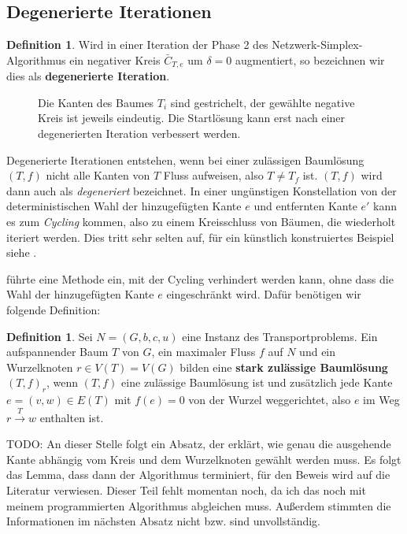 \documentclass[a4paper,twoside,ngerman]{report}
\theoremstyle{plain}
\theoremstyle{definition}
\newtheorem{defn}[thm]{Definition}
\begin{document}
\subsection{Degenerierte Iterationen}\label{ch:deg}

\begin{defn}Wird in einer Iteration der Phase 2 des Netzwerk-Simplex-Algorithmus ein negativer Kreis $\bar{C}_{T,e}$ um $\delta=0$ augmentiert, so bezeichnen wir dies als \textbf{degenerierte Iteration}.
\end{defn}

\begin{figure}[!ht]\centering
	
	\caption{Die Kanten des Baumes $T_i$ sind gestrichelt, der gewählte negative Kreis ist jeweils eindeutig. Die Startlösung kann erst nach einer degenerierten Iteration verbessert werden.}
	\label{fig:deg}
\end{figure}

Degenerierte Iterationen entstehen, wenn bei einer zulässigen Baumlösung $(T,f)$ nicht alle Kanten von $T$ Fluss aufweisen, also $T\neq T_f$ ist. $(T,f)$ wird dann auch als \emph{degeneriert} bezeichnet. In einer ungünstigen Konstellation von der deterministischen Wahl der hinzugefügten Kante $e$ und entfernten Kante $e'$ kann es zum \emph{Cycling} kommen, also zu einem Kreisschluss von Bäumen, die wiederholt iteriert werden. Dies tritt sehr selten auf, für ein künstlich konstruiertes Beispiel siehe \cite[S. 303]{NSAbook}.

\cite[Cunningham, 1976]{cycling} führte eine Methode ein, mit der Cycling verhindert werden kann, ohne dass die Wahl der hinzugefügten Kante $e$ eingeschränkt wird. Dafür benötigen wir folgende Definition:

\begin{defn}Sei $N=(G,b,c,u)$ eine Instanz des Transportproblems. Ein aufspannender Baum $T$ von $G$, ein maximaler Fluss $f$ auf $N$ und ein Wurzelknoten $r\in V(T)=V(G)$ bilden eine \textbf{stark zulässige Baumlösung} $(T,f)_r$, wenn $(T,f)$ eine zulässige Baumlösung ist und zusätzlich jede Kante $e=(v,w)\in E(T)$ mit $f(e)=0$ von der Wurzel weggerichtet, also $e$ im Weg $r\xrightarrow{T}w$ enthalten ist.\end{defn}


TODO: An dieser Stelle folgt ein Absatz, der erklärt, wie genau die ausgehende Kante abhängig vom Kreis und dem Wurzelknoten gewählt werden muss. Es folgt das Lemma, dass dann der Algorithmus terminiert, für den Beweis wird auf die Literatur verwiesen. Dieser Teil fehlt momentan noch, da ich das noch mit meinem programmierten Algorithmus abgleichen muss. Außerdem stimmten die Informationen im nächsten Absatz nicht bzw. sind unvollständig.
\end{document}
